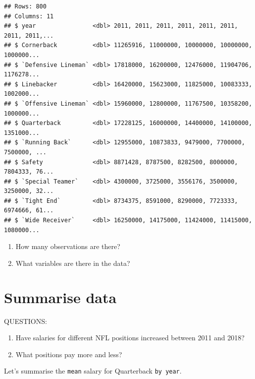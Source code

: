 \documentclass[
]{book}
\newenvironment{Shaded}{\begin{snugshade}}{\end{snugshade}}
\newcommand{\DataTypeTok}[1]{\textcolor[rgb]{0.13,0.29,0.53}{#1}}
\newcommand{\KeywordTok}[1]{\textcolor[rgb]{0.13,0.29,0.53}{\textbf{#1}}}
\newcommand{\NormalTok}[1]{#1}
\newcommand{\OperatorTok}[1]{\textcolor[rgb]{0.81,0.36,0.00}{\textbf{#1}}}
\newcommand{\OtherTok}[1]{\textcolor[rgb]{0.56,0.35,0.01}{#1}}
\newcommand{\StringTok}[1]{\textcolor[rgb]{0.31,0.60,0.02}{#1}}
\begin{document}
\begin{verbatim}
## Rows: 800
## Columns: 11
## $ year                <dbl> 2011, 2011, 2011, 2011, 2011, 2011, 2011, 2011,...
## $ Cornerback          <dbl> 11265916, 11000000, 10000000, 10000000, 1000000...
## $ `Defensive Lineman` <dbl> 17818000, 16200000, 12476000, 11904706, 1176278...
## $ Linebacker          <dbl> 16420000, 15623000, 11825000, 10083333, 1002000...
## $ `Offensive Lineman` <dbl> 15960000, 12800000, 11767500, 10358200, 1000000...
## $ Quarterback         <dbl> 17228125, 16000000, 14400000, 14100000, 1351000...
## $ `Running Back`      <dbl> 12955000, 10873833, 9479000, 7700000, 7500000, ...
## $ Safety              <dbl> 8871428, 8787500, 8282500, 8000000, 7804333, 76...
## $ `Special Teamer`    <dbl> 4300000, 3725000, 3556176, 3500000, 3250000, 32...
## $ `Tight End`         <dbl> 8734375, 8591000, 8290000, 7723333, 6974666, 61...
## $ `Wide Receiver`     <dbl> 16250000, 14175000, 11424000, 11415000, 1080000...
\end{verbatim}

\begin{enumerate}
\def\labelenumi{\arabic{enumi}.}
\setcounter{enumi}{4}
\item
  How many observations are there?
\item
  What variables are there in the data?
\end{enumerate}

\hypertarget{summarise-data}{%
\section{Summarise data}\label{summarise-data}}

QUESTIONS:

\begin{enumerate}
\def\labelenumi{\arabic{enumi})}
\item
  Have salaries for different NFL positions increased between 2011 and 2018?
\item
  What positions pay more and less?
\end{enumerate}

Let's summarise the \texttt{mean} salary for Quarterback \texttt{by\ year}.

\begin{Shaded}
\end{Shaded}
\end{document}
